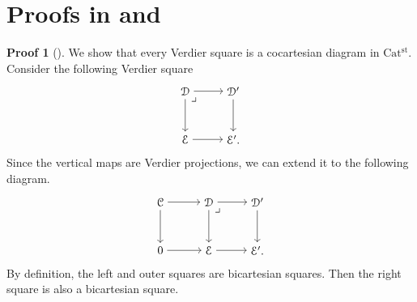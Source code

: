 \documentclass[a4paper,dvipdfmx,11pt,reqno]{amsart}
\newcommand{\C}{\mathcal{C}}
\newcommand{\D}{\mathcal{D}}
\newcommand{\E}{\mathcal{E}}
\newcommand{\Catst}{\mathrm{Cat^{st}}}
\theoremstyle{definition}
\newtheorem{newproof}[theorem]{Proof}
\begin{document}
\newpage
\appendix


\section{Proofs in  and }

\begin{newproof}[] \label{proof_of_Ber.rem.3.53}
  We show that every Verdier square is a cocartesian diagram in $\Catst$.
  Consider the following Verdier square
  \[\begin{tikzpicture}[auto,->] 
    \node (tl) at (0,1.5) {$\D$}; 
    \node (tr) at (1.5,1.5) {$\D'$};
    \node (bl) at (0,0) {$\E$}; 
    \node (br) at (1.5,0) {$\E'.$}; 
    \draw (tl) -- node {} (tr); 
    \draw (bl) -- node[swap] {} (br); 
    \draw (tl) -- node[swap] {} (bl);
    \draw (tr) -- node {} (br); 
    \node at (tl.south east) {$\lrcorner$};
  \end{tikzpicture}\]
  Since the vertical maps are Verdier projections, we can extend it to the following diagram.
  \[\begin{tikzpicture}[auto,->] 
    \node (tl) at (0,1.5) {$\C$};
    \node (tm) at (1.5,1.5) {$\D$}; 
    \node (tr) at (3,1.5) {$\D'$};
    \node (bl) at (0,0) {$0$}; 
    \node (bm) at (1.5,0) {$\E$};
    \node (br) at (3,0) {$\E'.$}; 
    \draw (tl) -- node {} (tm); 
    \draw (tm) -- node {} (tr); 
    \draw (bl) -- node[swap] {} (bm); 
    \draw (bm) -- node[swap] {} (br); 
    \draw (tl) -- node[swap] {} (bl);
    \draw (tm) -- node {} (bm);
    \draw (tr) -- node {} (br);
    \node at (tm.south east) {$\lrcorner$};
  \end{tikzpicture}\]
  By definition, the left and outer squares are bicartesian squares.
  Then the right square is also a bicartesian square.
\end{newproof}
\end{document}
